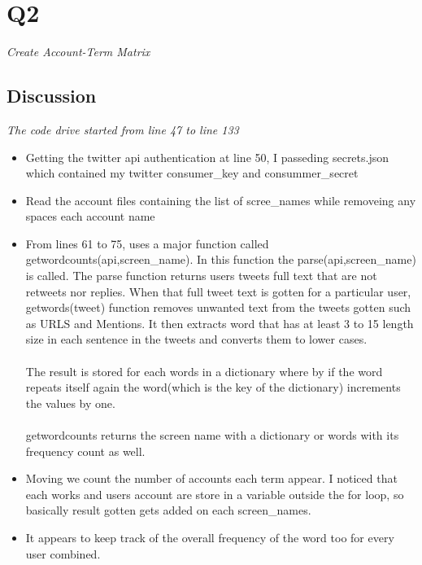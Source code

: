 \documentclass[12pt]{article}
\begin{document}
\section*{Q2}
\emph{Create Account-Term Matrix  }
\subsection*{\color{blue}{Answer}}

\subsection*{Discussion}
\emph{The code drive started from line 47 to line 133}
    \begin{itemize}
        \item Getting the twitter api authentication at line 50, I passeding secrets.json which contained my twitter consumer\_key and consummer\_secret
        \item Read the account files containing the list of scree\_names while removeing any spaces each account name
        \item From lines 61 to 75, uses a major function called getwordcounts(api,screen\_name). In this function the parse(api,screen\_name) is called. The parse function returns users tweets full text that are not retweets nor replies. When that full tweet text is gotten for a particular user, getwords(tweet) function removes unwanted text from the tweets gotten such as URLS and Mentions. It then extracts word that has at least 3 to 15 length size in each sentence in the tweets and converts them to lower cases. \\ \\The result is stored for each words in a dictionary where by if the word repeats itself again the word(which is the  key of the dictionary) increments the values by one. \\ \\ getwordcounts returns the screen name with a dictionary or words with its frequency count as well.
        \item Moving we count the number of accounts each term appear. I noticed that each works and users account are store in a variable outside the for loop, so basically result gotten gets added on each screen\_names.
        \item It appears to keep track of the overall frequency of the word too for every user combined.

\end{itemize}
\end{document}
